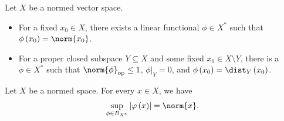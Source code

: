 \begin{theorem}\label{thm:hb_separation}
  Let $X$ be a normed vector space.
  \begin{itemize}
    \item For a fixed $x_0\in X$, there exists a linear functional $\phi\in X^{\ast}$ such that $\phi\left(x_0\right) = \norm{x_0}$.
    \item For a proper closed subspace $Y\subseteq X$ and some fixed $x_0\in X\setminus Y$, there is a $\phi\in X^{\ast}$ such that $\norm{\phi}_{\op} \leq 1$, $\phi|_{Y} = 0$, and $\phi\left(x_0\right) = \dist_{Y}\left(x_0\right)$.
  \end{itemize}
\end{theorem}
\begin{corollary}\label{cor:norm_from_functionals}
  Let $X$ be a normed space. For every $x\in X$, we have
  \begin{align*}
    \sup_{\phi\in B_{X^{\ast}}}\left\vert \varphi\left(x\right)  \right\vert = \norm{x}.
  \end{align*}
\end{corollary}
